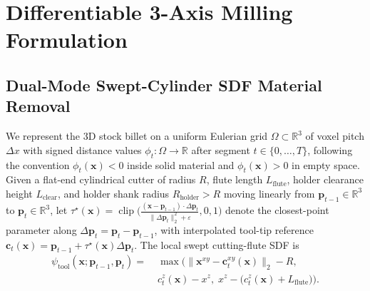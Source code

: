 \documentclass[conference]{IEEEtran}
\begin{document}
\section{Differentiable 3-Axis Milling Formulation}
\label{sec:formulation}

\subsection{Dual-Mode Swept-Cylinder SDF Material Removal}
We represent the 3D stock billet on a uniform Eulerian grid $\Omega \subset \mathbb{R}^3$ of voxel pitch $\Delta x$ with signed distance values $\phi_t : \Omega \to \mathbb{R}$ after segment $t \in \{0,\dots,T\}$, following the convention $\phi_t(\mathbf{x}) < 0$ inside solid material and $\phi_t(\mathbf{x}) > 0$ in empty space. Given a flat-end cylindrical cutter of radius $R$, flute length $L_{\text{flute}}$, holder clearance height $L_{\text{clear}}$, and holder shank radius $R_{\text{holder}} > R$ moving linearly from $\mathbf{p}_{t-1} \in \mathbb{R}^3$ to $\mathbf{p}_t \in \mathbb{R}^3$, let $\tau^\star(\mathbf{x}) = \operatorname{clip}\!\big(\frac{(\mathbf{x} - \mathbf{p}_{t-1})\cdot \Delta\mathbf{p}_t}{\|\Delta\mathbf{p}_t\|_2^2 + \varepsilon}, 0, 1\big)$ denote the closest-point parameter along $\Delta\mathbf{p}_t = \mathbf{p}_t - \mathbf{p}_{t-1}$, with interpolated tool-tip reference $\mathbf{c}_t(\mathbf{x}) = \mathbf{p}_{t-1} + \tau^\star(\mathbf{x})\Delta\mathbf{p}_t$. The local swept cutting-flute SDF is
\begin{equation}
  \begin{aligned}
    \psi_{\text{tool}}(\mathbf{x}; \mathbf{p}_{t-1}, \mathbf{p}_t) =\;& \max\Big(
      \|\mathbf{x}^{xy} - \mathbf{c}_t^{xy}(\mathbf{x})\|_2 - R, \\
      &c_t^z(\mathbf{x}) - x^z,\; x^z - \big(c_t^z(\mathbf{x}) + L_{\text{flute}}\big)\Big).
  \end{aligned}
  \label{eq:swept_tool}
\end{equation}
\end{document}
